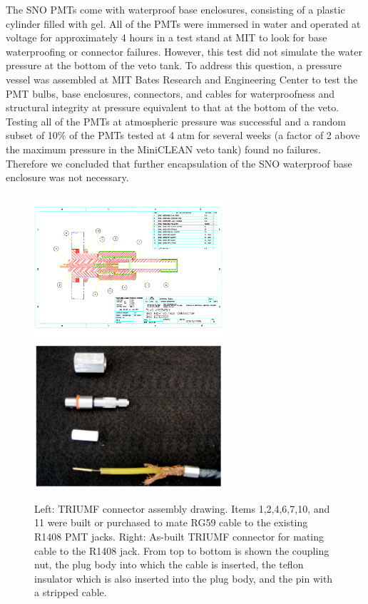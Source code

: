 \documentclass[review,number,sort&compress]{elsarticle}
\begin{document}
The SNO PMTs come with waterproof base enclosures, consisting of a
plastic cylinder filled with gel. All of the PMTs were immersed in water and operated at voltage for approximately 4 hours in a test stand at
MIT to look for base waterproofing or connector failures. However,
this test did not simulate the water pressure at the bottom of the
veto tank. To address this question, a pressure vessel was assembled
at MIT Bates Research and Engineering Center to test the PMT bulbs, base enclosures, connectors, and
cables for waterproofness and structural integrity at pressure
equivalent to that at the bottom of the veto. Testing
all of the PMTs at atmospheric pressure was successful and a random
subset of 10\% of the PMTs tested at 4 atm for several weeks (a factor of 2
above the maximum pressure in the MiniCLEAN veto tank) found no
failures. Therefore we concluded that further encapsulation of the
SNO waterproof base enclosure was not necessary.

\begin{figure}[ht]
\begin{center}
\includegraphics[width=2.75in]{graphics/snoConnectorDrawings.pdf}
\includegraphics[width=2.75in]{graphics/connectorpic.pdf}
\caption{Left: TRIUMF connector assembly drawing. Items 1,2,4,6,7,10, and 11 were built or purchased to mate RG59 cable to the existing R1408 PMT jacks. Right: As-built TRIUMF connector for mating cable to the R1408 jack. From top to bottom is shown the coupling nut, the plug body into which the cable is inserted, the teflon insulator which is also inserted into the plug body, and the pin with a stripped cable.
\label{fig:connectordrawing}}
\end{center}
\end{figure}
\end{document}
